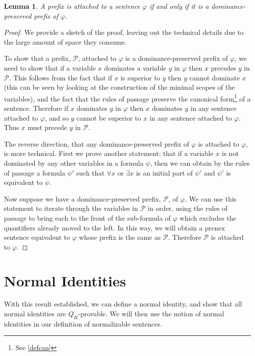 \documentclass[a4paper,12pt]{report}
\newtheorem{lem}{Lemma}[section]
\theoremstyle{definition}
\begin{document}
\begin{lem}
\label{attach produced}
A prefix is attached to a sentence $\varphi$ if and only if it is a dominance-preserved prefix of $\varphi$.
\end{lem}
\begin{proof}
We provide a sketch of the proof, leaving out the technical details due to the large amount of space they consume.

To show that a prefix, $\mathcal{P}$, attached to $\varphi$ is a dominance-preserved prefix of $\varphi$, we need to show that if a variable $x$ dominates a variable $y$ in $\varphi$ then $x$ precedes $y$ in $\mathcal{P}$. This follows from the fact that if $x$ is superior to $y$ then $y$ cannot dominate $x$ (this can be seen by looking at the construction of the minimal scopes of the variables), and the fact that the rules of passage preserve the canonical form\footnote{See \ref{defcan}} of a sentence. Therefore if $x$ dominates $y$ in $\varphi$ then $x$ dominates $y$ in any sentence attached to $\varphi$, and so $y$ cannot be superior to $x$ in any sentence attached to $\varphi$. Thus $x$ must precede $y$ in $\mathcal{P}$.

The reverse direction, that any dominance-preserved prefix of $\varphi$ is attached to $\varphi$, is more technical. First we prove another statement: that if a variable $x$ is not dominated by any other variables in a formula $\psi$, then we can obtain by the rules of passage a formula $\psi '$ such that $\forall x$ or $\exists x$ is an initial part of $\psi '$ and $\psi '$ is equivalent to $\psi$.

Now suppose we have a dominance-preserved prefix, $\mathcal{P}$, of $\varphi$. We can use this statement to iterate through the variables in $\mathcal{P}$ in order, using the rules of passage to bring each to the front of the sub-formula of $\varphi$ which excludes the quantifiers already moved to the left. In this way, we will obtain a prenex sentence equivalent to $\varphi$ whose prefix is the same as $\mathcal{P}$. Therefore $\mathcal{P}$ is attached to $\varphi$.
\end{proof}


\section{Normal Identities}
\label{sec:normal}

With this result established, we can define a normal identity, and show that all normal identities are $Q_H$-provable. We will then use the notion of normal identities in our definition of normalizable sentences.
\end{document}
